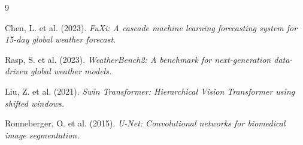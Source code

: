 \documentclass[12pt]{report}
\begin{document}
\begin{thebibliography}{9}

Chen, L. et al. (2023). \textit{FuXi: A cascade machine learning forecasting system for 15-day global weather forecast.}

Rasp, S. et al. (2023). \textit{WeatherBench2: A benchmark for next-generation data-driven global weather models.}

Liu, Z. et al. (2021). \textit{Swin Transformer: Hierarchical Vision Transformer using shifted windows.}

Ronneberger, O. et al. (2015). \textit{U-Net: Convolutional networks for biomedical image segmentation.}

\end{thebibliography}
\end{document}
